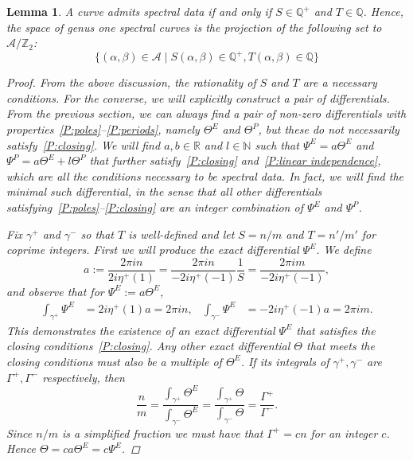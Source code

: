 \documentclass{article}
\numberwithin{equation}{section}
\numberwithin{figure}{section}
\newtheorem{lem}[equation]{Lemma}
\newcommand{\iu}{i}
\newcommand{\N}{\mathbb{N}}
\newcommand{\Q}{\mathbb{Q}}
\newcommand{\R}{\mathbb{R}}
\begin{document}
\begin{lem}\label{lem:closing_conds}
A curve admits spectral data if and only if $S\in\Q^+$ and $T\in\Q$. 
Hence, the space of genus one spectral curves is the projection of the following set to $\mathcal{A}/\mathbb{Z}_2$:
\[
\{(\alpha,\beta) \in \mathcal{A} \mid S(\alpha,\beta) \in \Q^+, T(\alpha,\beta) \in \Q\}
\]

\begin{proof}
From the above discussion, the rationality of $S$ and $T$ are a necessary conditions.
For the converse, we will explicitly construct a pair of differentials. From the previous section, we can always find a pair of non-zero differentials with properties~\ref{P:poles}--\ref{P:periods}, namely $\Theta^E$ and $\Theta^P$, but these do not necessarily satisfy~\ref{P:closing}. We will find $a,b \in \R$ and $l\in \N$ such that $\Psi^E = a\Theta^E$ and $\Psi^P = a\Theta^E + l\Theta^P$ that further satisfy~\ref{P:closing} and~\ref{P:linear independence}, which are all the conditions necessary to be spectral data. In fact, we will find the minimal such differential, in the sense that all other differentials satisfying~\ref{P:poles}--\ref{P:closing} are an integer combination of $\Psi^E$ and $\Psi^P$.

Fix $\gamma^+$ and $\gamma^-$ so that $T$ is well-defined and let $S = n/m$ and $T = n'/m'$ for coprime integers.
First we will produce the exact differential $\Psi^E$. 
We define
\[
a := \frac{2\pi\iu n}{2\iu \eta^+(1)} = \frac{2\pi\iu n}{-2\iu \eta^+(-1)}\frac{1}{S} = \frac{2\pi\iu m}{-2\iu \eta^+(-1)},
\]
and observe that for $\Psi^E := a\Theta^E$,
\begin{align*}
\int_{\gamma^{+}} \Psi^E &= 2\iu \eta^+(1)a = 2\pi \iu n, 
&
\int_{\gamma^{-}} \Psi^E &= -2i \eta^+(-1)a = 2\pi \iu m.
\end{align*}
This demonstrates the existence of an exact differential $\Psi^E$ that satisfies the closing conditions~\ref{P:closing}. 
Any other exact differential $\Theta$ that meets the closing conditions must also be a multiple of $\Theta^E$. If its integrals of $\gamma^+,\gamma^-$ are $\Gamma^+,\Gamma^-$ respectively, then 
\[
\frac{n}{m} 
= \frac{\int_{\gamma^+} \Theta^E}{\int_{\gamma^-} \Theta^E} 
= \frac{\int_{\gamma^+} \Theta}{\int_{\gamma^-} \Theta} 
= \frac{\Gamma^+}{\Gamma^-}.
\]
Since $n/m$ is a simplified fraction we must have that $\Gamma^+ = cn$ for an integer $c$. Hence $\Theta = ca\Theta^E = c \Psi^E$.



\end{proof}
\end{lem}
\end{document}
